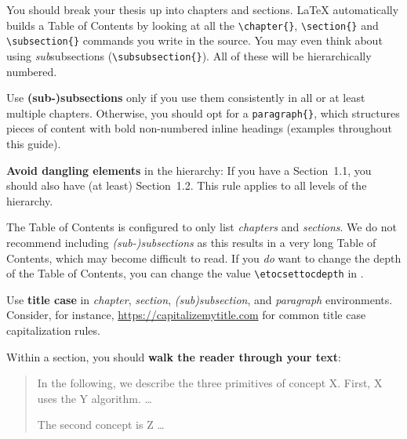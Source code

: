 You should break your thesis up into chapters and sections. LaTeX automatically builds a Table of Contents by looking at all the \verb|\chapter{}|, \verb|\section{}|  and \verb|\subsection{}| commands you write in the source. You may even think about using \emph{sub}subsections (\verb|\subsubsection{}|). All of these will be hierarchically numbered.

Use \textbf{(sub-)subsections} only if you use them consistently in all or at least multiple chapters. Otherwise, you should opt for a \verb|paragraph{}|, which structures pieces of content with bold non-numbered inline headings (examples throughout this guide).

\textbf{Avoid dangling elements} in the hierarchy: If you have a Section~1.1, you should also have (at least) Section~1.2. This rule applies to all levels of the hierarchy.

The Table of Contents is configured to only list \emph{chapters} and \emph{sections}. We do not recommend including \emph{(sub-)subsections} as this results in a very long Table of Contents, which may become difficult to read. If you \emph{do} want to change the depth of the Table of Contents, you can change the value \verb|\etocsettocdepth| in .

Use \textbf{title case} in \emph{chapter}, \emph{section}, \emph{(sub)subsection}, and \emph{paragraph} environments. Consider, for instance, \url{https://capitalizemytitle.com} for common title case capitalization rules.

Within a section, you should \textbf{walk the reader through your text}:
\begin{quote}
In the following, we describe the three primitives of concept X. First, X uses the Y algorithm. …

The second concept is Z …
\end{quote}

